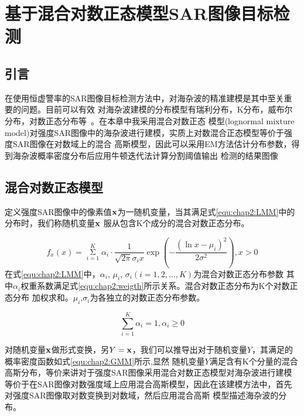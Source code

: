 \chapter{基于混合对数正态模型SAR图像目标检测}
\label{cha:LMM}

\section{引言}
\label{sec:chap2:sec1}
在使用恒虚警率的SAR图像目标检测方法中，对海杂波的精准建模是其中至关重要的问题。目前可以有效
对海杂波建模的分布模型有瑞利分布，K分布，威布尔分布，对数正态分布等~\cite{Carretero2010Statistical}。在本章中我采用混合对数正态
模型(lognormal mixture model)对强度SAR图像中的海杂波进行建模，实质上对数混合正态模型等价于强度SAR图像在对数域上的混合
高斯模型\cite{838811}，因此可以采用EM方法估计分布参数，得到海杂波概率密度分布后应用牛顿迭代法计算分割阈值输出
检测的结果图像


\section{混合对数正态模型}
\label{sec:chap2:sec2}
  定义强度SAR图像中的像素值$\bf{x}$为一随机变量，当其满足式\ref{equ:chap2:LMM}中的分布时，我们称随机变量$\bf{x}$
  服从包含K个成分的混合对数正态分布。

    \begin{equation}
      \label{equ:chap2:LMM}
      {f_x}(x) = \mathop \Sigma \limits_{i = 1}^K {\alpha _i} \cdot \frac{1}{{\sqrt {2\pi } {\sigma _i}x}}\exp ( - \frac{{{{(\ln x - {\mu _i})}^2}}}{{2{\sigma ^2}}}),x > 0
    \end{equation}
  在式\ref{equ:chap2:LMM}中，$\alpha_i$, $\mu_i$, $\sigma_i(i=1,2,...,K)$为混合对数正态分布参数
  其中$\alpha_i$权重系数满足式\ref{equ:chap2:weigth}所示关系。混合对数正态分布为K个对数正态分布
  加权求和。$\mu_i$,$\sigma_i$为各独立的对数正态分布参数。

    \begin{equation}
      \label{equ:chap2:weigth}
      \sum\limits_{i = 1}^K {{\alpha _i} = 1,{\alpha _i} \ge 0} 
    \end{equation}

  对随机变量$\bf{x}$做形式变换，另$Y=\bf{x}$，我们可以推导出对于随机变量$Y$，其满足的概率密度函数如式\ref{equ:chap2:GMM}所示,显然
  随机变量$Y$满足含有K个分量的混合高斯分布，等价来讲对于强度SAR图像采用混合对数正态模型对海杂波进行建模
  等价于在SAR图像对数强度域上应用混合高斯模型，因此在该建模方法中，首先对强度SAR图像取对数变换到对数域，然后应用混合高斯
  模型描述海杂波的分布。

